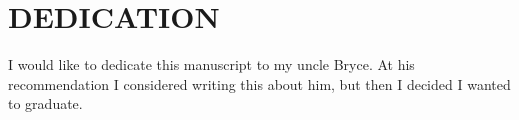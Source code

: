 \chapter*{DEDICATION}

I would like to dedicate this manuscript to my uncle Bryce. At his 
recommendation I considered writing this about him, but then I decided I 
wanted to graduate.


